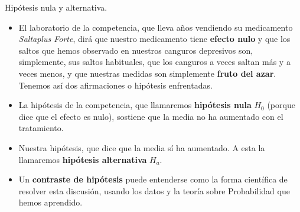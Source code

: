 \documentclass[
  9pt,
  ignorenonframetext,
]{beamer}
\providecommand{\tightlist}{%
  \setlength{\itemsep}{0pt}\setlength{\parskip}{0pt}}
\begin{document}
\begin{frame}{Hipótesis nula y alternativa.}
\protect\hypertarget{hipotesis-nula-y-alternativa.}{}

\vspace{4mm}

\begin{itemize}
\tightlist
\item
  El laboratorio de la competencia, que lleva años vendiendo su
  medicamento \emph{Saltaplus Forte}, dirá que nuestro medicamento tiene
  \textbf{efecto nulo} y que los saltos que hemos observado en nuestros
  canguros depresivos son, simplemente, sus saltos habituales, que los
  canguros a veces saltan más y a veces menos, y que nuestras medidas
  son simplemente \textbf{fruto del azar}. Tenemos así dos afirmaciones
  o hipótesis enfrentadas.
\end{itemize}

\vspace{2mm}

\begin{itemize}
\tightlist
\item
  La hipótesis de la competencia, que llamaremos \textbf{hipótesis nula}
  \(H_0\) (porque dice que el efecto es nulo), sostiene que la media no
  ha aumentado con el tratamiento.\vspace{2mm}\\
\item
  Nuestra hipótesis, que dice que la media sí ha aumentado. A esta la
  llamaremos \textbf{hipótesis alternativa} \(H_a\).
\end{itemize}

\vspace{2mm}

\begin{itemize}
\tightlist
\item
  Un \textbf{contraste de hipótesis} puede entenderse como la forma
  científica de resolver esta discusión, usando los datos y la teoría
  sobre Probabilidad que hemos aprendido.
\end{itemize}

\vspace{6mm}

\quad

\end{frame}
\end{document}

